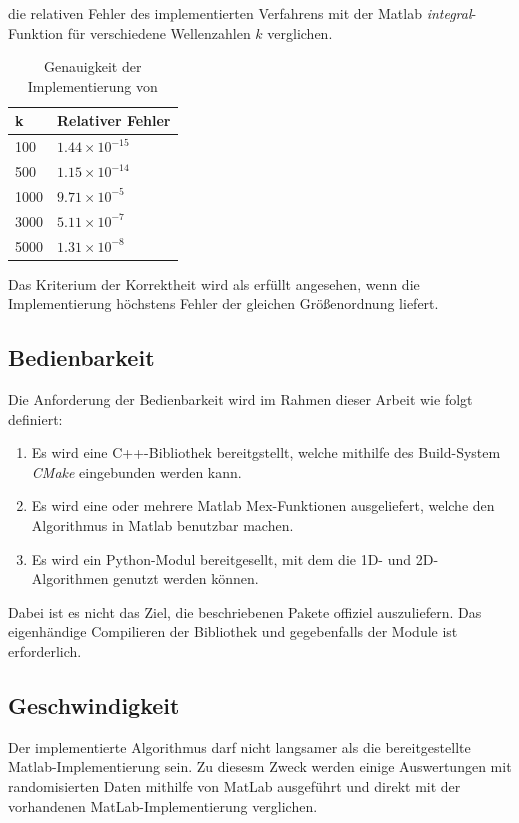 die relativen Fehler des implementierten Verfahrens mit der Matlab \textit{integral}-Funktion für verschiedene Wellenzahlen $k$ verglichen.
\begin{table}[ht]
    \centering
    \begin{tabular}{|l|l|}
    \hline
    k & Relativer Fehler \\ 
    \hline \hline
    100  & $1.44 × 10^{-15}$ \\
    500  &  $1.15 × 10^{-14}$ \\
    1000 &  $9.71 × 10^{-5}$ \\
    3000 &  $5.11 × 10^{-7}$ \\
    5000 & $1.31 × 10^{-8}$ \\  \hline
    \end{tabular}    
    \caption{Genauigkeit der Implementierung von \cite*[]{gasperini:hal-03209144}}
\end{table} 
Das Kriterium der Korrektheit wird als erfüllt angesehen, wenn die Implementierung höchstens Fehler der gleichen Größenordnung liefert.


\subsection{Bedienbarkeit}

Die Anforderung der Bedienbarkeit wird im Rahmen dieser Arbeit wie folgt definiert:

\begin{enumerate}
    \item Es wird eine C++-Bibliothek bereitgstellt, welche mithilfe des Build-System \textit{CMake} eingebunden werden kann. 
    \item Es wird eine oder mehrere Matlab Mex-Funktionen ausgeliefert, welche den Algorithmus in Matlab benutzbar machen. 
    \item Es wird ein Python-Modul bereitgesellt, mit dem die 1D- und 2D-Algorithmen genutzt werden können.
\end{enumerate}

Dabei ist es nicht das Ziel, die beschriebenen Pakete offiziel auszuliefern. Das eigenhändige Compilieren der Bibliothek und gegebenfalls der Module ist erforderlich.

\subsection{Geschwindigkeit}\label{Performance}


Der implementierte Algorithmus darf nicht langsamer als die bereitgestellte Matlab-Implementierung sein.
Zu diesesm Zweck werden einige Auswertungen mit randomisierten Daten mithilfe von MatLab ausgeführt und direkt mit der vorhandenen MatLab-Implementierung verglichen.



